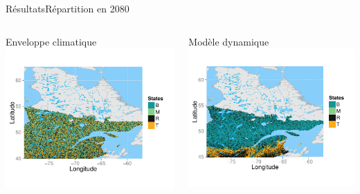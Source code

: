 \documentclass[10pt,aspectratio=149]{beamer}
\begin{document}

   \begin{frame}{Résultats}{Répartition en 2080}
      \begin{columns}
         \begin{column}{0.5\textwidth}
            \begin{center}
               Enveloppe climatique
               \includegraphics[height=0.6\textheight]{Figs/SDM_map_2080}
           \end{center} 
         \end{column}
         \begin{column}{0.5\textwidth}
            \begin{center}
               Modèle dynamique
               \includegraphics[height=0.6\textheight]{Figs/STM_map_2080}
           \end{center} 
         \end{column}
      \end{columns}  
   \end{frame}
\end{document}

